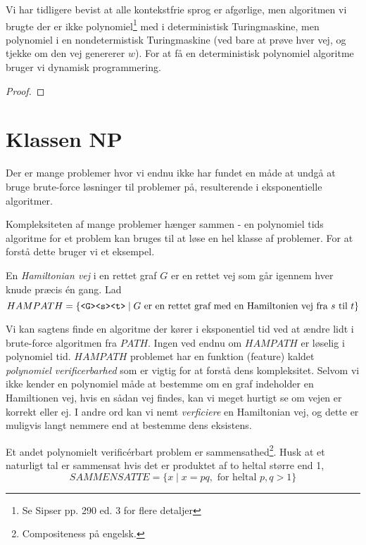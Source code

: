 Vi har tidligere bevist at alle kontekstfrie sprog er afgørlige, men algoritmen vi brugte der er ikke polynomiel\footnote{Se Sipser pp. 290 ed. 3 for flere detaljer} med i deterministisk Turingmaskine, men polynomiel i en nondetermistisk Turingmaskine (ved bare at prøve hver vej, og tjekke om den vej genererer $w$). For at få en deterministisk polynomiel algoritme bruger vi dynamisk programmering.
\begin{proof}

\end{proof}

\section{Klassen NP}%
\label{sec:np}

Der er mange problemer hvor vi endnu ikke har fundet en måde at undgå at bruge brute-force løsninger til problemer på, resulterende i eksponentielle algoritmer.

Kompleksiteten af mange problemer hænger sammen - en polynomiel tids algoritme for et problem kan bruges til at løse en hel klasse af problemer. For at forstå dette bruger vi et eksempel.

En \textit{Hamiltonian vej} i en rettet graf $G$ er en rettet vej som går igennem hver knude præcis én gang. Lad
\begin{equation*}
	HAMPATH = \{\text{\texttt{<G><s><t>}} \mid G \text{ er en rettet graf med en Hamiltonien vej fra } s \text{ til } t\}
\end{equation*}

Vi kan sagtens finde en algoritme der kører i eksponentiel tid ved at ændre lidt i brute-force algoritmen fra $PATH$. Ingen ved endnu om $HAMPATH$ er løselig i polynomiel tid. $HAMPATH$ problemet har en funktion (feature) kaldet \textit{polynomiel verificerbarhed} som er vigtig for at forstå dens kompleksitet. Selvom vi ikke kender en polynomiel måde at bestemme om en graf indeholder en Hamiltionen vej, hvis en sådan vej findes, kan vi meget hurtigt se om vejen er korrekt eller ej. I andre ord kan vi nemt \textit{verficiere} en Hamiltonian vej, og dette er muligvis langt nemmere end at bestemme dens eksistens.

Et andet polynomielt verificérbart problem er sammensathed\footnote{Compositeness på engelsk.}. Husk at et naturligt tal er sammensat hvis det er produktet af to heltal større end 1,
\begin{equation*}
	SAMMENSATTE = \{x \mid x = pq, \text{ for heltal } p, q > 1\}
\end{equation*}

